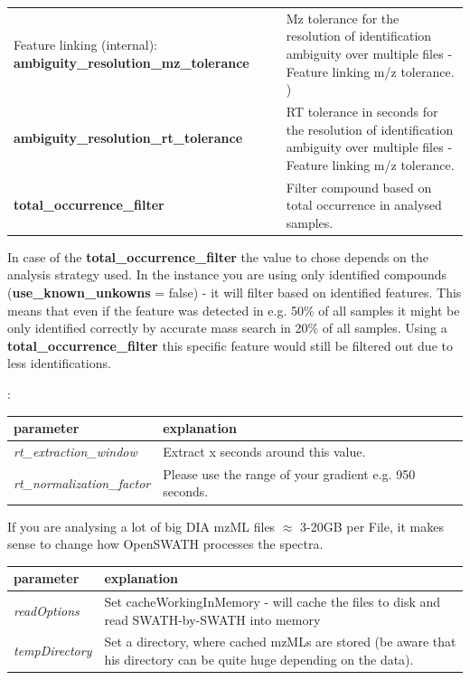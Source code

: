 \begin{center}
\begin{tabular*}{\textwidth}{ p{5.5cm}|p{10.5cm} }
Feature linking (internal):
\textbf{ambiguity\_resolution\_mz\_tolerance} & Mz tolerance for the resolution of identification ambiguity over multiple files - Feature linking m/z tolerance. ) \\
\textbf{ambiguity\_resolution\_rt\_tolerance} & RT tolerance in seconds for the resolution of identification ambiguity over multiple files - Feature linking m/z tolerance. \\
\textbf{total\_occurrence\_filter} & Filter compound based on total occurrence in analysed samples.\\
\end{tabular*}
\end{center}

In case of the \textbf{total_occurrence_filter} the value to chose depends on the analysis strategy used. In the instance you are using only identified compounds (\textbf{use_known_unkowns} = false) - it will filter based on identified features. This means that even if the feature was detected in e.g. 50\% of all samples it might be only identified correctly by accurate mass search in 20\% of all samples. Using a \textbf{total_occurrence_filter} this specific feature would still be filtered out  due to less identifications. 

\noindent{}:
\begin{center}
\begin{tabular*}{\textwidth}{ p{5.5cm}|p{10.5cm} }
\textbf{parameter} & \textbf{explanation} \\ \hline
\textit{rt\_extraction\_window} & Extract x seconds around this value. \\
\textit{rt\_normalization\_factor} &  Please use the range of your gradient e.g. 950 seconds. \\
\end{tabular*}
\end{center} 

\noindent If you are analysing a lot of big DIA mzML files $\approx$ 3-20GB per File, it makes sense to change how OpenSWATH processes the spectra. 

\begin{center}
\begin{tabular*}{\textwidth}{ p{5.5cm}|p{10.5cm} }
\textbf{parameter} & \textbf{explanation} \\ \hline
\textit{readOptions} & Set cacheWorkingInMemory - will cache the files to disk and read SWATH-by-SWATH into memory\\
\textit{tempDirectory} &  Set a directory, where cached mzMLs are stored (be aware that his directory can be quite huge depending on the data). \\
\end{tabular*}
\end{center} 

